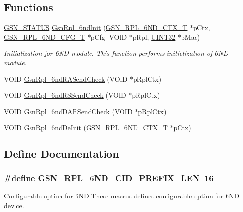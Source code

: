 \subsection*{Functions}
\begin{DoxyCompactItemize}
\item 
\hyperlink{a00660_gada5951904ac6110b1fa95e51a9ddc217}{GSN\_\-STATUS} \hyperlink{a00473_a49997069b5ef94b797c3d64a8acba37e}{GsnRpl\_\-6ndInit} (\hyperlink{a00194}{GSN\_\-RPL\_\-6ND\_\-CTX\_\-T} $\ast$pCtx, \hyperlink{a00193}{GSN\_\-RPL\_\-6ND\_\-CFG\_\-T} $\ast$pCfg, VOID $\ast$pRpl, \hyperlink{a00660_gae1e6edbbc26d6fbc71a90190d0266018}{UINT32} $\ast$pMac)
\begin{DoxyCompactList}\small\item\em Initialization for 6ND module. This function performs initialization of 6ND module. \end{DoxyCompactList}\item 
VOID \hyperlink{a00473_ae0a3df6fa0aa6761c64ee4a68de6f2ec}{GsnRpl\_\-6ndRASendCheck} (VOID $\ast$pRplCtx)
\item 
VOID \hyperlink{a00473_a145f3d0e7c20995ca598d54175647ac9}{GsnRpl\_\-6ndRSSendCheck} (VOID $\ast$pRplCtx)
\item 
VOID \hyperlink{a00473_a0073b2bbad3c72a75b7fd82f8b56911d}{GsnRpl\_\-6ndDARSendCheck} (VOID $\ast$pRplCtx)
\item 
VOID \hyperlink{a00473_aef0beacba820a0d287ad05f8503fa5e7}{GsnRpl\_\-6ndDeInit} (\hyperlink{a00194}{GSN\_\-RPL\_\-6ND\_\-CTX\_\-T} $\ast$pCtx)
\end{DoxyCompactItemize}


\subsection{Define Documentation}
\hypertarget{a00473_a15bbd2855dec494244c0b4c6155ff66f}{
\subsubsection[{GSN\_\-RPL\_\-6ND\_\-CID\_\-PREFIX\_\-LEN}]{\setlength{\rightskip}{0pt plus 5cm}\#define GSN\_\-RPL\_\-6ND\_\-CID\_\-PREFIX\_\-LEN~16}}
\label{a00473_a15bbd2855dec494244c0b4c6155ff66f}


Configurable option for 6ND These macros defines configurable option for 6ND device. 



